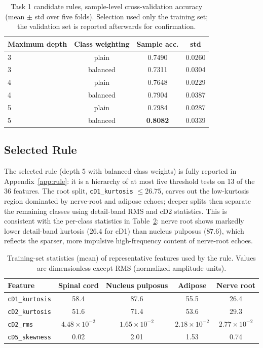 \documentclass[11pt]{article}
\begin{document}
\begin{table}[htbp]
\centering
\caption{Task 1 candidate rules, sample-level cross-validation accuracy
(mean $\pm$ std over five folds). Selection used only the training set;
the validation set is reported afterwards for confirmation.}
\label{tab:t1cv}
\small
\begin{tabular}{lccc}
\toprule
Maximum depth & Class weighting & Sample acc. & std\\
\midrule
3 & plain & 0.7490 & 0.0260\\
3 & balanced & 0.7311 & 0.0304\\
4 & plain & 0.7648 & 0.0229\\
4 & balanced & 0.7904 & 0.0387\\
5 & plain & 0.7984 & 0.0287\\
5 & balanced & \textbf{0.8082} & 0.0339\\
\bottomrule
\end{tabular}
\end{table}

\subsection{Selected Rule}

The selected rule (depth 5 with balanced class weights) is fully reported in
Appendix~\ref{app:rule}: it is a hierarchy of at most five threshold tests on
13 of the 36 features. The root split, \texttt{cD1\_kurtosis} $\le 26.75$,
carves out the low-kurtosis region dominated by nerve-root and adipose echoes;
deeper splits then separate the remaining classes using detail-band RMS and
cD2 statistics. This is
consistent with the per-class statistics in Table~\ref{tab:t1stats}: nerve root
shows markedly lower detail-band kurtosis ($26.4$ for cD1) than nucleus
pulposus ($87.6$), which reflects the sparser, more impulsive high-frequency
content of nerve-root echoes.

\begin{table}[htbp]
\centering
\caption{Training-set statistics (mean) of representative features used by the
rule. Values are dimensionless except RMS (normalized amplitude units).}
\label{tab:t1stats}
\small
\begin{tabular}{lcccc}
\toprule
Feature & Spinal cord & Nucleus pulposus & Adipose & Nerve root\\
\midrule
\texttt{cD1\_kurtosis} & 58.4 & 87.6 & 55.5 & 26.4\\
\texttt{cD2\_kurtosis} & 51.6 & 71.4 & 53.6 & 29.3\\
\texttt{cD2\_rms} & $4.48\times10^{-2}$ & $1.65\times10^{-2}$ & $2.18\times10^{-2}$ & $2.77\times10^{-2}$\\
\texttt{cD5\_skewness} & 0.02 & 2.01 & 1.53 & 0.74\\
\bottomrule
\end{tabular}
\end{table}
\end{document}
